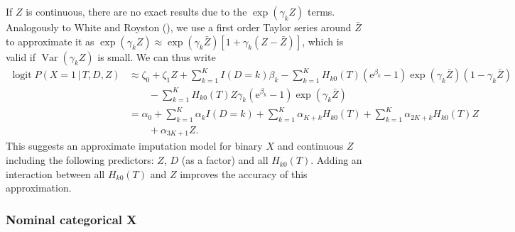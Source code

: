 \documentclass[
  letterpaper,
  paper=240mm:170mm,
  twoside=true,
  open=right,
  fontsize=10pt,
  pagesize=false,
  BCOR=15mm,
  DIV=14,
  headinclude=true,
  footinclude=false,
  headsepline=on]{scrbook}
\DeclareMathOperator{\logit}{logit}
\DeclareMathOperator{\Var}{Var}
\newcommand{\given}{\,|\,}
\begin{document}
If \(Z\) is continuous, there are no exact results due to the
\(\exp(\gamma_k Z)\) terms. Analogously to White and Royston
(), we use a first
order Taylor series around \(\bar{Z}\) to approximate it as
\(\exp(\gamma_k Z) \approx \exp(\gamma_k \bar{Z}) [ 1 + \gamma_k(Z - \bar{Z})  ]\),
which is valid if \(\Var(\gamma_k Z)\) is small. We can thus write
\begin{align*}
    \logit P(X = 1 \given T, D, Z) &\approx \zeta_0 + \zeta_1 Z + \sum^K_{k = 1} I(D=k) \beta_k \nonumber - \sum^K_{k = 1} H_{k0}(T)(\mathrm{e}^{\beta_k}  - 1)\exp(\gamma_k \bar{Z})(1 - \gamma_k \bar{Z}) \nonumber \\
    &\qquad - \sum^K_{k = 1} H_{k0}(T) Z \gamma_k (\mathrm{e}^{\beta_k}  - 1)\exp(\gamma_k \bar{Z}) \nonumber \\
    &= \alpha_0  + \sum^K_{k = 1} \alpha_{k} I(D=k) + \sum^K_{k = 1} \alpha_{K + k} H_{k0}(T) + \sum^K_{k = 1} \alpha_{2K + k} H_{k0}(T) Z \nonumber \\
    &\qquad + \alpha_{3K + 1} Z.
\end{align*} This suggests an approximate imputation model for binary
\(X\) and continuous \(Z\) including the following predictors: \(Z\),
\(D\) (as a factor) and all \(H_{k0}(T)\). Adding an interaction between
all \(H_{k0}(T)\) and \(Z\) improves the accuracy of this approximation.

\subsubsection*{Nominal categorical X}\label{nominal-categorical-x-1}
\end{document}
